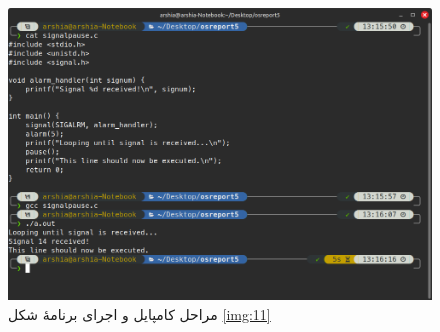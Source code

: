 \documentclass[12pt]{article}
\begin{document}
	\begin{figure}[H]
		\centering
		\includegraphics[width=\textwidth]{report5-resources/12.png}
		\caption{مراحل کامپایل و اجرای برنامهٔ شکل \ref{img:11}}
		\label{img:12}
	\end{figure}
\end{document}
